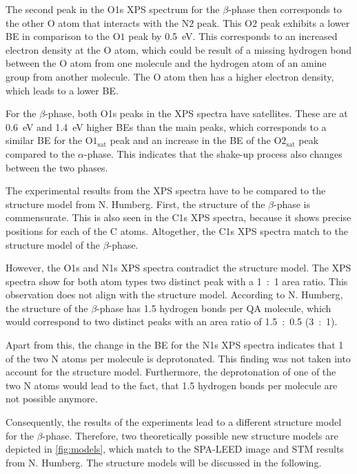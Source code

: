 The second peak in the O1s \ac{XPS} spectrum for the $\beta$-phase then corresponds to the other O atom that interacts with the $\mathrm{N2}$ peak. This $\mathrm{O2}$ peak exhibits a lower \ac{BE} in comparison to the $\mathrm{O1}$ peak by 0.5~\si{\eV}. This corresponds to an increased electron density at the O atom, which could be result of a missing hydrogen bond between the O atom from one molecule and the hydrogen atom of an amine group from another molecule. The O atom then has a higher electron density, which leads to a lower \ac{BE}.

For the $\beta$-phase, both O1s peaks in the \ac{XPS} spectra have satellites. These are at 0.6~\si{\eV} and 1.4~\si{\eV} higher \acp{BE} than the main peaks, which corresponds to a similar \ac{BE} for the $\mathrm{O1_{sat}}$ peak and an increase in the \ac{BE} of the $\mathrm{O2_{sat}}$ peak compared to the $\alpha$-phase. This indicates that the shake-up process also changes between the two phases.

The experimental results from the \ac{XPS} spectra have to be compared to the structure model from N. Humberg.\autocite{Humberg2024} First, the structure of the $\beta$-phase is commensurate. This is also seen in the C1s \ac{XPS} spectra, because it shows precise positions for each of the C atoms. Altogether, the C1s \ac{XPS} spectra match to the structure model of the $\beta$-phase.

However, the O1s and N1s \ac{XPS} spectra contradict the structure model. The \ac{XPS} spectra show for both atom types two distinct peak with a  1~:~1 area ratio. This observation does not align with the structure model. According to N. Humberg\autocite{Humberg2024}, the structure of the $\beta$-phase has 1.5 hydrogen bonds per \ac{QA} molecule, which would correspond to two distinct peaks with an area ratio of 1.5~:~0.5 (3~:~1).

Apart from this, the change in the \ac{BE} for the N1s \ac{XPS} spectra indicates that 1 of the two N atoms per molecule is deprotonated. This finding was not taken into account for the structure model. Furthermore, the deprotonation of one of the two N atoms would lead to the fact, that 1.5 hydrogen bonds per molecule are not possible anymore.

Consequently, the results of the experiments lead to a different structure model for the $\beta$-phase. Therefore, two theoretically possible new structure models are depicted in \autoref{fig:models}, which match to the SPA-LEED image and STM results from N. Humberg.\autocite{Humberg2024} The structure models will be discussed in the following.

